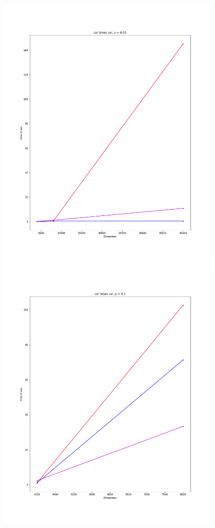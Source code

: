 \documentclass[12pt]{article}
\begin{document}
\begin{figure}[h]
  \includegraphics[scale = 0.16]{csr_csr_01.PNG}
  \includegraphics[scale = 0.16]{csr_csr_1.PNG}

\end{figure}
\end{document}
